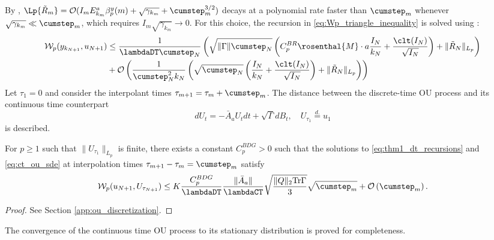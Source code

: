 \documentclass[11pt]{article}
\begin{document}
By , $\Lp{\tilde{R}_m} = \mathcal{O}(I_m E_{k_m}^a \beta_p^y(m) + \sqrt{\gamma_{k_m}} + \cumstep_m^{3/2})$ decays at a polynomial rate faster than $\cumstep_m$ whenever $\sqrt{\gamma_{k_m}} \ll \cumstep_m$, which requires $I_m \sqrt{\gamma_{k_m}} \to 0$.
For this choice, the recursion in \eqref{eq:Wp_triangle_inequality} is solved using :
\begin{equation}\label{eq:yN_uN}
\begin{split}
    \mathcal{W}_{p} (y_{k_{N+1}}, u_{N+1}) 
    &\leq
    \frac{1}{\lambdaDT \cumstep_N} \left(
    \sqrt{\lVert \Gamma \rVert \cumstep_N} \left(C_{p}^{BR} \rosenthal{M} \cdot a \frac{I_N}{k_N} + \frac{\clt(I_N)}{\sqrt{I_N}} \right)
    + \lVert \tilde{R}_N \rVert_{L_p}
    \right)    
    \\ &
    + \mathcal{O}\left(\frac{1}{\cumstep_N^2 k_N} \left( \sqrt{\cumstep_N} \left(\frac{I_N}{k_N} + \frac{ \clt (I_N)}{\sqrt{I_N}} \right) + \lVert \tilde{R}_N \rVert_{L_p} \right) \right)
\end{split}
\end{equation}
Let $\tau_1 = 0$ and consider the interpolant times $\tau_{m+1} = \tau_m + \cumstep_m$. 
The distance between the discrete-time OU process and its continuous time counterpart 
\begin{equation}\label{eq:ct_ou_sde}
    dU_t = - \bar{A}_a U_t dt + \sqrt{\Gamma} dB_t , \quad U_{\tau_1} \overset{d.}{=} u_1
\end{equation}
is described.
\begin{lemma}\label{lem:ou_discretization}
    For $p \geq 1$ such that $\lVert U_{\tau_1} \rVert_{L_p}$ is finite, there exists a constant $C_p^{BDG} > 0$ such that the solutions to \eqref{eq:thm1_dt_recursions} and \eqref{eq:ct_ou_sde} at interpolation times $\tau_{m+1} - \tau_m = \cumstep_m$ satisfy
    \begin{equation}\label{eq:ou_discretization}
    \mathcal{W}_p (u_{N+1}, U_{\tau_{N+1}}) 
    \leq 
    K \frac{C_p^{BDG}}{\lambdaDT} 
    \frac{\lVert \bar{A}_a \rVert }{\lambdaCT} \sqrt{\frac{\lVert Q \rVert_2\mathrm{Tr} \Gamma}{3}} \sqrt{\cumstep_m}
    + \mathcal{O}\left(\cumstep_m \right) 
    .
    \end{equation}
\end{lemma}
\begin{proof}
    See Section \ref{app:ou_discretization}.
\end{proof}
The convergence of the continuous time OU process to its stationary distribution is proved for completeness.
\end{document}
